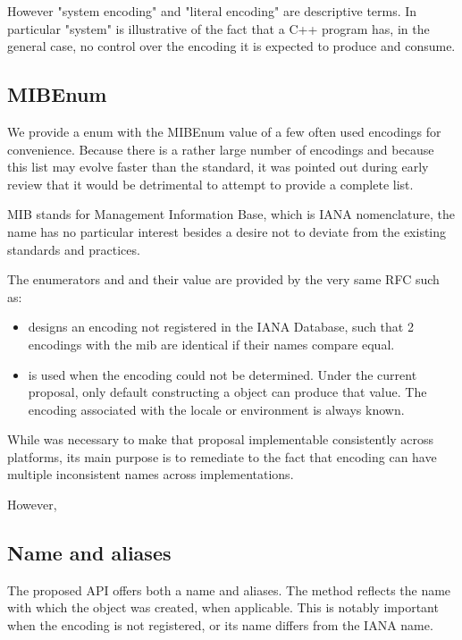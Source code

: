 \documentclass{wg21}
\begin{document}
However "system encoding" and "literal encoding" are descriptive terms. In particular "system" is illustrative of the
fact that a C++ program has, in the general case, no control over the encoding it is expected to produce and consume.

\subsection{MIBEnum}

We provide a  enum with the MIBEnum value of a few often used encodings for convenience.
Because there is a rather large number of encodings and because this list may evolve faster than the standard, it was pointed out during early review that it would be detrimental to attempt to provide a complete list.
\begin{note}
MIB stands for Management Information Base, which is IANA nomenclature, the name has no particular interest besides a desire not to deviate from the existing standards and practices.
\end{note}


The enumerators  and  and their value are provided by the very same RFC such as:

\begin{itemize}
	\item {} designs an encoding not registered in the IANA Database, such that 2 encodings with the  mib are identical if their names compare equal.
	\item {} is used when the encoding could not be determined. Under the current proposal,  only default constructing a  object can produce that value. The encoding associated with the locale or environment is always known.
\end{itemize}

While  was necessary to make that proposal implementable consistently across platforms,
its main purpose is to remediate to the fact that encoding can have multiple inconsistent names across implementations.

However,

\subsection{Name and aliases}

The proposed API offers both a name and aliases.
The  method reflects the name with which the  object was created, when applicable.
This is notably important when the encoding is not registered, or its name differs from the IANA name.
\end{document}
